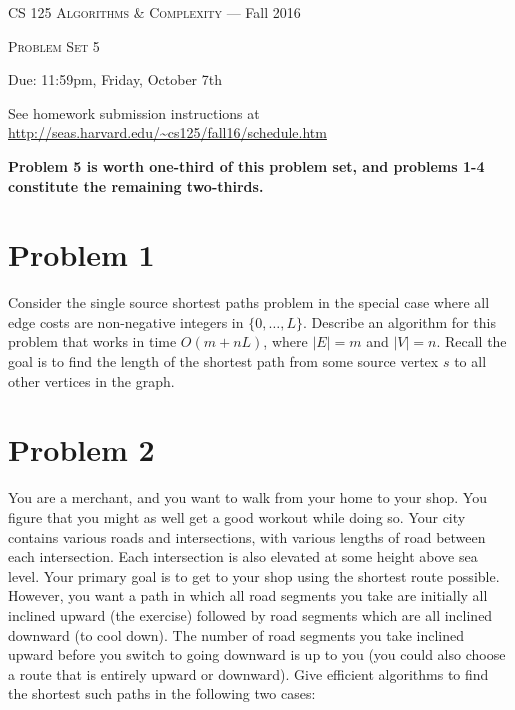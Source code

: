 \documentclass[12pt]{article}
\begin{document}
\thispagestyle{empty}

\begin{center}
{\Large \textsc{CS 125 Algorithms \& Complexity} --- Fall 2016}

\bigskip

{\Large \textsc{Problem Set 5}}

\smallskip

Due: 11:59pm, Friday, October 7th

\bigskip

{\footnotesize See homework submission instructions at \url{http://seas.harvard.edu/~cs125/fall16/schedule.htm}}
\end{center}

\textbf{Problem 5 is worth one-third of this problem set, and problems 1-4 constitute the remaining two-thirds.}

\bigskip

\section*{Problem 1} 

Consider the single source shortest paths problem in the special case where all edge costs are non-negative integers in $\{0,\ldots,L\}$.  Describe an algorithm for this problem that works in time $O(m + nL)$, where $|E|=m$ and $|V|=n$. Recall the goal is to find the length of the shortest path from some source vertex $s$ to all other vertices in the graph.

\section*{Problem 2}

You are a merchant, and you want to walk from your home to your shop. You figure that you might as well get a good workout while doing so. Your city contains various roads and intersections, with various lengths of road between each intersection. Each intersection is also elevated at some height above sea level. Your primary goal is to get to your shop using the shortest route possible. However, you want a path in which all road segments you take are initially all inclined upward (the exercise) followed by road segments which are all inclined downward (to cool down). The number of road segments you take inclined upward before you switch to going downward is up to you (you could also choose a route that is entirely upward or downward). Give efficient algorithms to find the shortest such paths in the following two cases:
\end{document}
